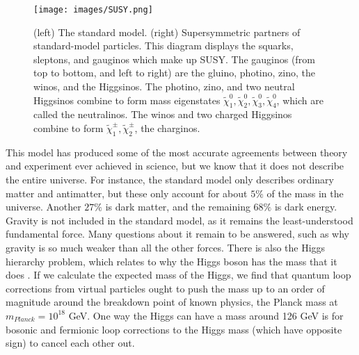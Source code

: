 \begin{figure}[t]
    \centering
    \texttt{[image: images/SUSY.png]}
    \caption{(left) The standard model. (right) Supersymmetric partners of standard-model particles. This diagram displays the squarks, sleptons, and gauginos which make up SUSY. The gauginos (from top to bottom, and left to right) are the gluino, photino, zino, the winos, and the Higgsinos. The photino, zino, and two neutral Higgsinos combine to form mass eigenstates $\tilde{\chi}^0_1, \tilde{\chi}^0_2, \tilde{\chi}^0_3, \tilde{\chi}^0_4$, which are called the neutralinos. The winos and two charged Higgsinos combine to form $\tilde{\chi}^\pm_1, \tilde{\chi}^\pm_2$, the charginos.}
    \label{SUSY}
\end{figure}

This model has produced some of the most accurate agreements between theory and experiment ever achieved in science, but we know that it does not describe the entire universe. For instance, the standard model only describes ordinary matter and antimatter, but these only account for about $5\%$ of the mass in the universe. Another $27\%$ is dark matter, and the remaining $68\%$ is dark energy. Gravity is not included in the standard model, as it remains the least-understood fundamental force. Many questions about it remain to be answered, such as why gravity is so much weaker than all the other forces. There is also the Higgs hierarchy problem, which relates to why the Higgs boson has the mass that it does \cite{hierarchy}. If we calculate the expected mass of the Higgs, we find that quantum loop corrections from virtual particles ought to push the mass up to an order of magnitude around the breakdown point of known physics, the Planck mass at $m_{Planck} = 10^{18}$ GeV. One way the Higgs can have a mass around 126 GeV is for bosonic and fermionic loop corrections to the Higgs mass (which have opposite sign) to cancel each other out.